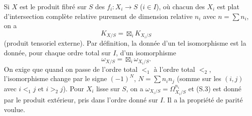 \documentclass[11pt,leqno]{article}
\begin{document}
Si $X$ est le produit fibré sur $S$ des $f_i:X_i\to S$ ($i\in I$), où chacun des $X_i$ est plat d'intersection complète relative purement de dimension relative $n_i$ avec $n=\sum n_i$, on a
\begin{equation}
        K_{X/S}=\boxtimes_i K_{X_i/S} \tag{S.2}
\end{equation}
(produit tensoriel externe). Par définition, la donnée d'un tel isomorphisme est la donnée, pour chaque ordre total sur $I$, d'un isomorphisme
\begin{equation}
        \omega_{X/S}=\boxtimes_i\omega_{X_i/S}. \tag{S.3}
\end{equation}
On exige que quand on passe de l'ordre total $<_1$ à l'ordre total $<_2$, l'isomorphisme change par le signe $(-1)^N$, $N=\sum n_in_j$ (somme sur les $(i,j)$ avec $i<_1j$ et $i>_2j$). Pour $X_i$ lisse sur $S$, on a $\omega_{X_i/S}=\Omega^{n_i}_{X_i/S}$ et (S.3) est donné par le produit extérieur, pris dans l'ordre donné sur $I$. Il a la propriété de parité voulue.
\end{document}
